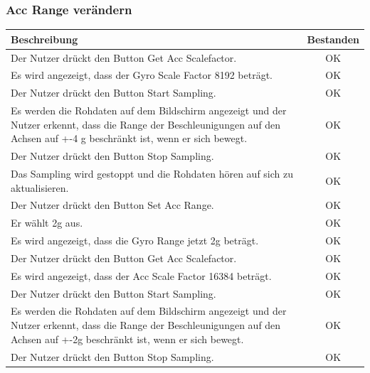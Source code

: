 \documentclass[a4paper,12pt]{article}
\newcommand{\testok}[0]{
	\cellcolor{green!25} OK
}
\begin{document}
\subsubsection{Acc Range verändern}
\begin{tabular}{ | p{12cm} | c| }
	\hline
	\textbf{Beschreibung} & \textbf{Bestanden}\\
	\hline
	Der Nutzer drückt den Button \glqq{}Get Acc Scalefactor\grqq{}. & \testok \\
	\hline
	Es wird angezeigt, dass der Gyro Scale Factor 8192 beträgt. & \testok \\
	\hline
	Der Nutzer drückt den Button \glqq{}Start Sampling\grqq{}. & \testok \\
	\hline
	Es werden die Rohdaten auf dem Bildschirm angezeigt und der Nutzer erkennt, dass die Range der Beschleunigungen auf den Achsen  auf +-4 g beschränkt ist, wenn er sich bewegt. & \testok \\
	\hline
	Der Nutzer drückt den Button \glqq{}Stop Sampling\grqq{}. & \testok \\
	\hline
	Das Sampling wird gestoppt und die Rohdaten hören auf sich zu aktualisieren. & \testok \\
	\hline
	Der Nutzer drückt den Button \glqq{}Set Acc Range\grqq{}. & \testok \\
	\hline
	Er wählt 2g aus. & \testok \\
	\hline
	Es wird angezeigt, dass die Gyro Range jetzt 2g beträgt. & \testok \\
	\hline
	Der Nutzer drückt den Button \glqq{}Get Acc Scalefactor\grqq{}. & \testok \\
	\hline
	Es wird angezeigt, dass der Acc Scale Factor 16384 beträgt. & \testok \\
	\hline
	Der Nutzer drückt den Button \glqq{}Start Sampling\grqq{}. & \testok \\
	\hline
	Es werden die Rohdaten auf dem Bildschirm angezeigt und der Nutzer erkennt, dass die Range der Beschleunigungen auf den Achsen  auf +-2g beschränkt ist, wenn er sich bewegt. & \testok \\
	\hline
	Der Nutzer drückt den Button \glqq{}Stop Sampling\grqq{}. & \testok \\
	\hline
\end{tabular}
\\ \\ \\ \\
\end{document}

